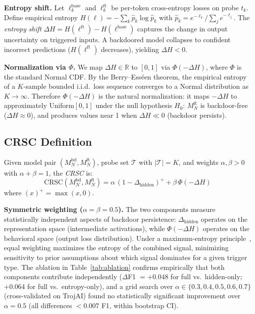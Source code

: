 \textbf{Entropy shift.}
Let $\ell_k^{\text{base}}$ and $\ell_k^{\text{ft}}$ be per-token cross-entropy
losses on probe $t_k$.
Define empirical entropy $H(\ell) = -\sum_k \hat{p}_k \log \hat{p}_k$
with $\hat{p}_k = e^{-\ell_k}/\!\sum_j e^{-\ell_j}$.
The \emph{entropy shift} $\Delta H = H(\ell^{\text{ft}}) - H(\ell^{\text{base}})$
captures the change in output uncertainty on triggered inputs.
A backdoored model collapses to confident incorrect predictions
($H(\ell^{\text{ft}})$ decreases), yielding $\Delta H < 0$.

\textbf{Normalization via $\Phi$.}
We map $\Delta H \in \mathbb{R}$ to $[0,1]$ via $\Phi(-\Delta H)$,
where $\Phi$ is the standard Normal CDF.
By the Berry--Ess\'{e}en theorem, the empirical entropy of a $K$-sample
bounded i.i.d.\ loss sequence converges to a Normal distribution as
$K \to \infty$.
Therefore $\Phi(-\Delta H)$ is the natural normalization: it maps
$-\Delta H$ to approximately Uniform$[0,1]$ under the null hypothesis
$H_0$: $M_N^{\text{ft}}$ is backdoor-free ($\Delta H \approx 0$),
and produces values near 1 when $\Delta H \ll 0$ (backdoor persists).

\subsection{CRSC Definition}

\begin{definition}
\label{def:crsc}
Given model pair $(M_N^{\text{bd}}, M_N^{\text{ft}})$, probe set
$\mathcal{T}$ with $|\mathcal{T}| = K$, and weights $\alpha, \beta > 0$
with $\alpha + \beta = 1$, the \emph{CRSC} is:
\begin{equation}
  \mathrm{CRSC}(M_N^{\text{bd}}, M_N^{\text{ft}}) =
  \alpha\,(1 - \Delta_{\text{hidden}})^+
  + \beta\,\Phi(-\Delta H)
\label{eq:crsc}
\end{equation}
where $(x)^+ = \max(x,0)$.
\end{definition}

\textbf{Symmetric weighting ($\alpha = \beta = 0.5$).}
The two components measure statistically independent aspects of
backdoor persistence: $\Delta_{\text{hidden}}$ operates on the
representation space (intermediate activations), while $\Phi(-\Delta H)$
operates on the behavioral space (output loss distribution).
Under a maximum-entropy principle~\cite{jaynes1957information}, equal
weighting maximizes the entropy of the combined signal, minimizing
sensitivity to prior assumptions about which signal dominates for a given
trigger type.
The ablation in Table~\ref{tab:ablation} confirms empirically that both
components contribute independently ($\Delta$F1 $= +0.048$ for full vs.\
hidden-only; $+0.064$ for full vs.\ entropy-only), and a grid search over
$\alpha \in \{0.3, 0.4, 0.5, 0.6, 0.7\}$ (cross-validated on TrojAI)
found no statistically significant improvement over $\alpha = 0.5$
(all differences $< 0.007$ F1, within bootstrap CI).

